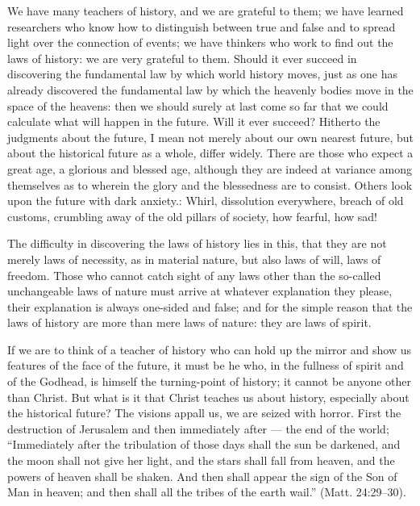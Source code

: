 \documentclass[12pt,a4paper,openany]{book}
\newcommand{\opage}[1]{\marginnote{\footnotesize\textit{[#1]}}}
\begin{document}
We have many teachers of history, and we are grateful to them;
we have learned researchers who know how to distinguish
between true and false and to spread light over the connection
of events; we have thinkers who work
to find out the laws of history: we are very grateful to them.
Should it ever succeed in discovering the
fundamental law by which world history moves, just
\setcounter{footnote}{0}%
\opage{37}as one has already discovered the fundamental law by which
the heavenly bodies move in the space of the heavens: then we should
surely at last come so far that we could calculate
what will happen in the future. Will it ever
succeed? Hitherto the judgments about the future, I
mean not merely about our own nearest future, but about the
historical future as a whole, differ widely. There are
those who expect a great age, a glorious and blessed
age, although they are indeed at variance among themselves as to
wherein the glory and the blessedness are to consist. Others
look upon the future with dark anxiety.: Whirl,
dissolution everywhere, breach of old customs, crumbling away
of the old pillars of society, how fearful,
how sad!

The difficulty in discovering the laws of history
lies in this, that they are not merely laws of necessity, as
in material nature, but also laws of will, laws of freedom.
Those who cannot catch sight of any laws other
than the so-called unchangeable laws of nature must
arrive at whatever explanation they please, their explanation
is always one-sided and false; and for the simple
reason that the laws of history are more than mere laws of nature:
they are laws of spirit.

If we are to think of a teacher of history who can
hold up the mirror and show us features of the face of the future,
it must be he who, in the fullness of spirit and of the Godhead,
is himself the turning-point of history; it cannot
be anyone other than Christ. But what is it
that Christ teaches us about history, especially about the historical
future? The visions appall us, we are seized with horror.
First the destruction of Jerusalem and then immediately after ---
the end of the world; ``Immediately after the tribulation of those days
\setcounter{footnote}{0}%
\opage{38}shall the sun be darkened, and the moon shall not give her light,
and the stars shall fall from heaven, and the powers of heaven
shall be shaken. And then shall appear the sign of the Son of Man
in heaven; and then shall all the tribes of the earth wail.''
(Matt. 24:29--30).
\end{document}

